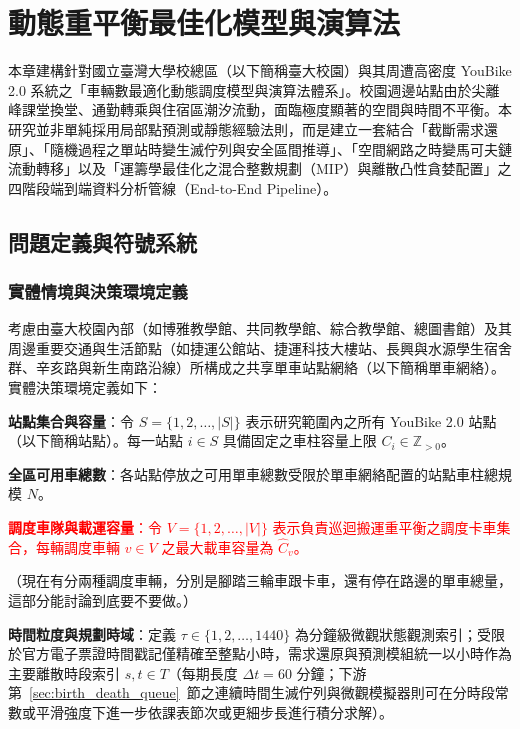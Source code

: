 
\chapter{動態重平衡最佳化模型與演算法}\label{chap:Dynamic Rebalancing Models & Algorithms}

本章建構針對國立臺灣大學校總區（以下簡稱臺大校園）與其周遭高密度 YouBike 2.0 系統之「車輛數最適化動態調度模型與演算法體系」。校園週邊站點由於尖離峰課堂換堂、通勤轉乘與住宿區潮汐流動，面臨極度顯著的空間與時間不平衡。本研究並非單純採用局部點預測或靜態經驗法則，而是建立一套結合「截斷需求還原」、「隨機過程之單站時變生滅佇列與安全區間推導」、「空間網路之時變馬可夫鏈流動轉移」以及「運籌學最佳化之混合整數規劃（MIP）與離散凸性貪婪配置」之四階段端到端資料分析管線（End-to-End Pipeline）。

\section{問題定義與符號系統}

\subsection{實體情境與決策環境定義}

考慮由臺大校園內部（如博雅教學館、共同教學館、綜合教學館、總圖書館）及其周邊重要交通與生活節點（如捷運公館站、捷運科技大樓站、長興與水源學生宿舍群、辛亥路與新生南路沿線）所構成之共享單車站點網絡（以下簡稱單車網絡）。實體決策環境定義如下：
\begin{enumerate}[label = \textbullet]
    \item \textbf{站點集合與容量}：令 $S = \{1, 2, \dots, |S|\}$ 表示研究範圍內之所有 YouBike 2.0 站點（以下簡稱站點）。每一站點 $i \in S$ 具備固定之車柱容量上限 $C_i \in \mathbb{Z}_{>0}$。
    \item \textbf{全區可用車總數}：各站點停放之可用單車總數受限於單車網絡配置的站點車柱總規模 $N$。
    \textcolor{red}{\item \textbf{調度車隊與載運容量}：令 $V = \{1, 2, \dots, |V|\}$ 表示負責巡迴搬運重平衡之調度卡車集合，每輛調度車輛 $v \in V$ 之最大載車容量為 $\hat{C}_v$。}（現在有分兩種調度車輛，分別是腳踏三輪車跟卡車，還有停在路邊的單車總量，這部分能討論到底要不要做。）
    \item \textbf{時間粒度與規劃時域}：定義 $\tau \in \{1, 2, \dots, 1440\}$ 為分鐘級微觀狀態觀測索引；受限於官方電子票證時間戳記僅精確至整點小時，需求還原與預測模組統一以小時作為主要離散時段索引 $s, t \in T$（每期長度 $\Delta t = 60$ 分鐘；下游第~\ref{sec:birth_death_queue}~節之連續時間生滅佇列與微觀模擬器則可在分時段常數或平滑強度下進一步依課表節次或更細步長進行積分求解）。
\end{enumerate}

